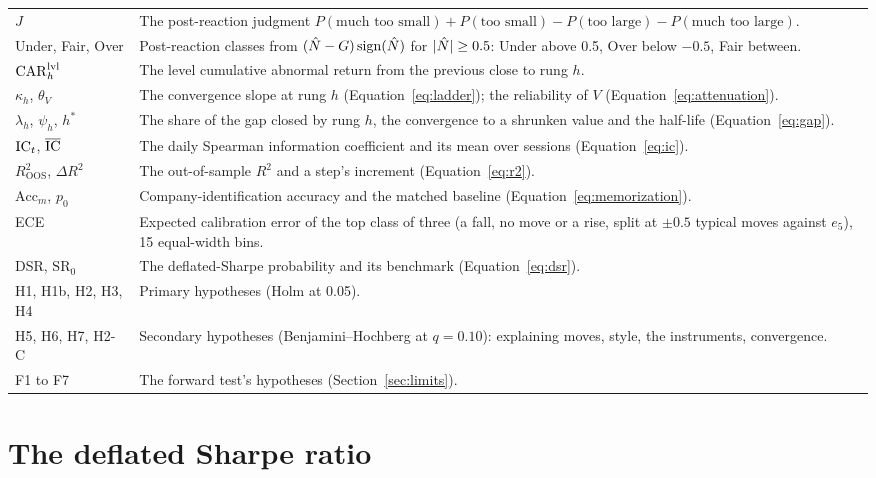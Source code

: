 {\begin{longtable}{@{}>{\raggedright\arraybackslash}p{1.35in}>{\raggedright\arraybackslash}p{4.95in}@{}}
$J$ & The post-reaction judgment $P(\text{much too small}) + P(\text{too small}) - P(\text{too large}) -
P(\text{much too large})$. \\
Under, Fair, Over & Post-reaction classes from $(\hat N - G)\,\mathrm{sign}(\hat N)$ for $|\hat N| \ge 0.5$: Under
above 0.5, Over below $-0.5$, Fair between. \\
$\mathrm{CAR}^{\mathrm{lvl}}_{h}$ & The level cumulative abnormal return from the previous close to rung $h$. \\
$\kappa_h$, $\theta_V$ & The convergence slope at rung $h$ (Equation~\eqref{eq:ladder}); the reliability of $V$
(Equation~\eqref{eq:attenuation}). \\
$\lambda_h$, $\psi_h$, $h^{*}$ & The share of the gap closed by rung $h$, the convergence to a shrunken value and
the half-life (Equation~\eqref{eq:gap}). \\
$\mathrm{IC}_t$, $\overline{\mathrm{IC}}$ & The daily Spearman information coefficient and its mean over sessions
(Equation~\eqref{eq:ic}). \\
$R^{2}_{\mathrm{OOS}}$, $\Delta R^{2}$ & The out-of-sample $R^2$ and a step's increment
(Equation~\eqref{eq:r2}). \\
$\mathrm{Acc}_m$, $p_0$ & Company-identification accuracy and the matched baseline
(Equation~\eqref{eq:memorization}). \\
ECE & Expected calibration error of the top class of three (a fall, no move or a rise, split at $\pm 0.5$
typical moves against $e_5$), 15 equal-width bins. \\
DSR, $\mathrm{SR}_0$ & The deflated-Sharpe probability and its benchmark (Equation~\eqref{eq:dsr}). \\
H1, H1b, H2, H3, H4 & Primary hypotheses (Holm at 0.05). \\
H5, H6, H7, H2-C & Secondary hypotheses (Benjamini--Hochberg at $q = 0.10$): explaining moves, style, the
instruments, convergence. \\
F1 to F7 & The forward test's hypotheses (Section~\ref{sec:limits}). \\
\end{longtable}
}

\section{The deflated Sharpe ratio}\label{app:dsr}

